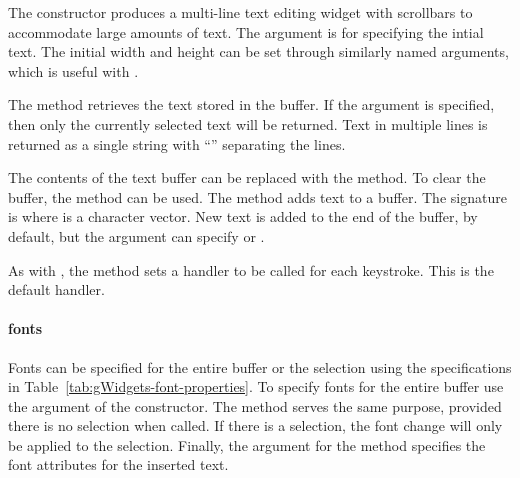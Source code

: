The  constructor produces a multi-line text editing
widget with scrollbars to accommodate large amounts of text. The
 argument is for specifying the intial
text. The initial width and height can be
set through similarly named arguments, which is useful with
. 

The  method retrieves the text stored in the
buffer. If the argument  is specified, then only the
currently selected text will be returned. Text in multiple lines is
returned as a single string with ``\backslashn'' separating the lines.

The contents of the text buffer can be replaced with the
 method. To clear the buffer, the
 method can be used. The 
method adds text to a buffer. The signature is 
where  is a character vector. New text is added to the end
of the buffer, by default, but the  argument
can specify  or .




As with , the  method
sets a handler to be called for each keystroke. This is the default
handler.

\paragraph{fonts}
Fonts can be specified for the entire buffer or the selection using
the specifications in Table~\ref{tab:gWidgets-font-properties}. To
specify fonts for the entire buffer use the
 argument of the constructor. The
 method serves the same purpose, provided
there is no selection when called. If there is a selection, the font
change will only be applied to the selection. Finally, the
 argument for the  method
specifies the font attributes for the inserted text.

